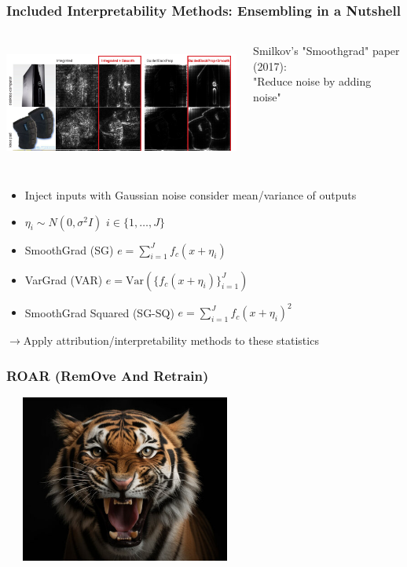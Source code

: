 \documentclass{beamer}
\theoremstyle{mystyle}
\begin{document}
\begin{frame}
    \frametitle{Included Interpretability Methods: Ensembling in a Nutshell}
    \begin{columns}[T] %
        \begin{column}{0.7\textwidth}
            \includegraphics[width=1.0\textwidth, height=4cm]{compareSGBP.png}
        \end{column}
        \begin{column}{0.3\textwidth}
		Smilkov's "Smoothgrad" paper (2017): \\
		"Reduce noise by adding noise"
        \end{column}
    \end{columns}
    \begin{itemize}
        \item Inject inputs with Gaussian noise consider mean/variance of outputs \pause
        \item $\eta_i \sim N(0, \sigma ^2 I)$ $i\in \{1,\ldots, J\} $ \pause
	\item SmoothGrad (SG) $e = \sum_{i=1}^{J} {f_{c}( x + \eta_i) }$ \pause
	\item VarGrad (VAR) $e = \text{Var}( \{ {f_{c}(x + \eta_i)} \}_{i=1}^J) $ \pause
	\item SmoothGrad Squared (SG-SQ) $e = \sum_{i=1}^{J} {f_{c}( x + \eta_i)^{2} }$\pause
    \end{itemize}
$\to$Apply attribution/interpretability methods to these statistics
\end{frame}


\begin{frame}
	\frametitle{ROAR (RemOve And Retrain)}
	\includegraphics[height=5.5cm, width=8cm]{tiger.png}\\
\end{frame}
\end{document}
